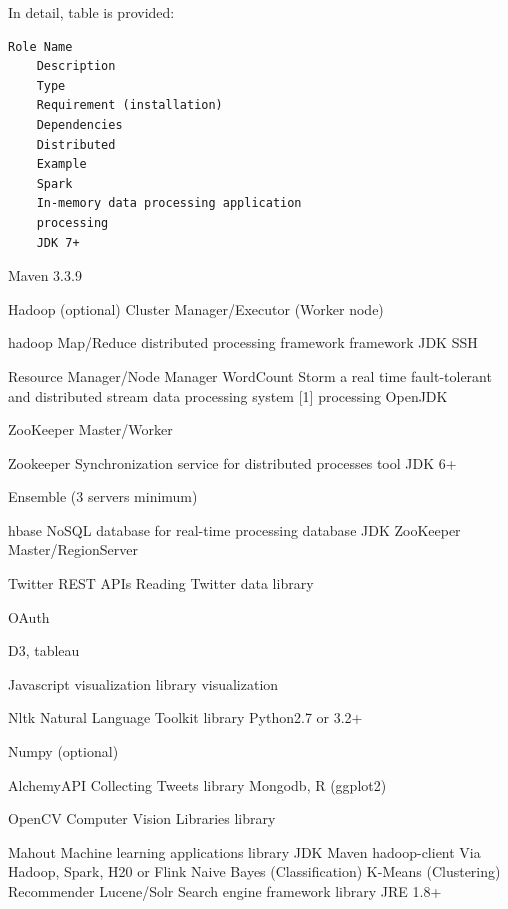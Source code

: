 \documentclass[9pt,twocolumn,twoside]{styles/osajnl}
\begin{document}
In detail, table is provided:

\begin{verbatim}
Role Name
	Description
	Type
	Requirement (installation)
	Dependencies
	Distributed
	Example
	Spark
	In-memory data processing application
	processing
	JDK 7+
\end{verbatim}

Maven 3.3.9

	Hadoop (optional)
	Cluster Manager/Executor (Worker node)
	

	hadoop
	Map/Reduce distributed processing framework
	framework
	JDK
SSH
	

	Resource Manager/Node Manager
	WordCount
	Storm
	a real time fault-tolerant and distributed stream data processing system [1]
	processing
	OpenJDK


	ZooKeeper
	Master/Worker
	

	Zookeeper
	Synchronization service for distributed processes
	tool
	JDK 6+
	

	Ensemble (3 servers minimum)

	

	hbase
	NoSQL database for real-time processing
	database
	JDK
	ZooKeeper
	Master/RegionServer
	

	Twitter REST APIs
	Reading Twitter data
	library
	

	OAuth
	

	

	D3, tableau

	Javascript visualization library
	visualization
	

	

	

	

	Nltk
	Natural Language Toolkit
	library
	Python2.7 or 3.2+

	Numpy (optional)
	

	

	AlchemyAPI
	Collecting Tweets
	library
	Mongodb, R (ggplot2)
	

	

	

	OpenCV
	Computer Vision Libraries
	library
	

	

	

	

	Mahout
	Machine learning applications
	library
	JDK
Maven
	hadoop-client
	Via Hadoop, Spark, H20 or Flink
	Naive Bayes (Classification)
K-Means (Clustering)
Recommender
	Lucene/Solr
	Search engine framework
	library
	JRE 1.8+
	
\end{document}
